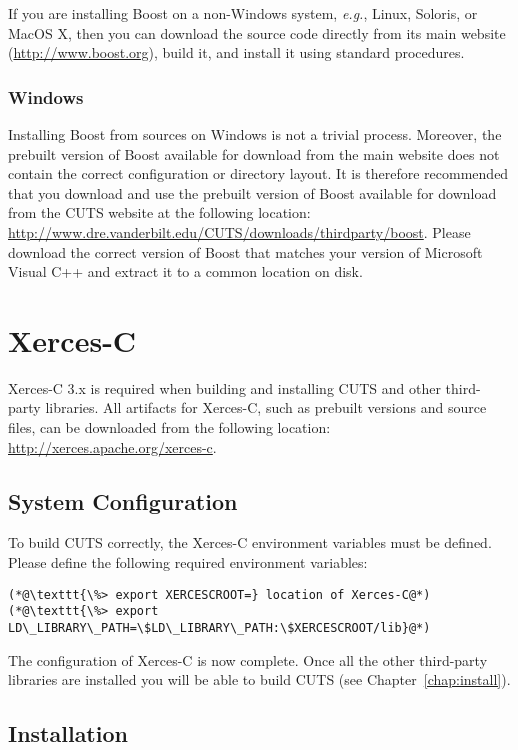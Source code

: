If you are installing Boost on a non-Windows system, \textit{e.g.}, Linux, 
Soloris, or MacOS X, then you can download the source code directly from its
main website (\url{http://www.boost.org}), build it, and install it using
standard procedures.

\subsubsection{Windows}

Installing Boost from sources on Windows is not a trivial process. 
Moreover, the prebuilt version of Boost available for download from 
the main website does not contain the correct configuration or directory
layout. It is therefore recommended that you download and use the prebuilt 
version of Boost available for download from the CUTS website at the 
following location:
\url{http://www.dre.vanderbilt.edu/CUTS/downloads/thirdparty/boost}. Please download
the correct version of Boost that matches your version of Microsoft Visual
C++ and extract it to a common location on disk.

\section{Xerces-C}
\label{sec:thirdparty-xercesc}

Xerces-C 3.x is required when building and installing CUTS and other third-party
libraries. All artifacts for Xerces-C, such as prebuilt versions and source files, 
can be downloaded from the following location: \url{http://xerces.apache.org/xerces-c}. 

\subsection{System Configuration}

To build CUTS correctly, the Xerces-C environment variables must be defined. Please 
define the following required environment variables:
\begin{lstlisting}
(*@\texttt{\%> export XERCESCROOT=} location of Xerces-C@*)
(*@\texttt{\%> export LD\_LIBRARY\_PATH=\$LD\_LIBRARY\_PATH:\$XERCESCROOT/lib}@*)
\end{lstlisting}
The configuration of Xerces-C is now complete. Once all the other
third-party libraries are installed you will be able to build CUTS
(see Chapter~\ref{chap:install}).

\subsection{Installation}


